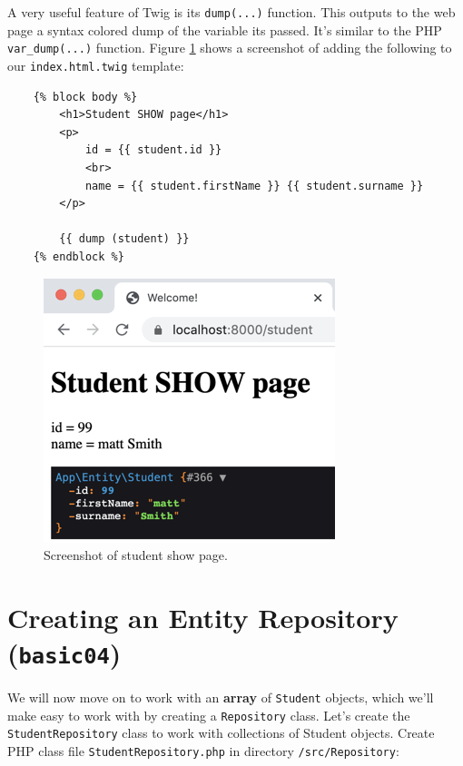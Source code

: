 \documentclass[a4paperpaper,openright]{book}
\begin{document}
A very useful feature of Twig is its \texttt{dump(...)} function. This
outputs to the web page a syntax colored dump of the variable its
passed. It's similar to the PHP \texttt{var\_dump(...)} function. Figure
\ref{twig_debug} shows a screenshot of adding the following to our
\texttt{index.html.twig} template:

\begin{verbatim}
    {% block body %}
        <h1>Student SHOW page</h1>
        <p>
            id = {{ student.id }}
            <br>
            name = {{ student.firstName }} {{ student.surname }}
        </p>
    
        {{ dump (student) }}
    {% endblock %}
\end{verbatim}

\begin{figure}
\centering
\includegraphics{./tex2pdf.-65f13e14688ab55b/76a4f1af025bb43ea8894fe24899f7e9550b20e3.png}
\caption{Screenshot of student show page. \label{twig_debug}}
\end{figure}

\hypertarget{creating-an-entity-repository-basic04}{%
\section{\texorpdfstring{Creating an Entity Repository
(\texttt{basic04})}{Creating an Entity Repository (basic04)}}\label{creating-an-entity-repository-basic04}}

We will now move on to work with an \textbf{array} of \texttt{Student}
objects, which we'll make easy to work with by creating a
\texttt{Repository} class. Let's create the \texttt{StudentRepository}
class to work with collections of Student objects. Create PHP class file
\texttt{StudentRepository.php} in directory \texttt{/src/Repository}:
\end{document}
